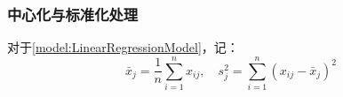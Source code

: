 \subsubsection{中心化与标准化处理}
\begin{definition}
	对于\cref{model:LinearRegressionModel}，记：
	\begin{equation*}
		\bar{x}_j=\frac{1}{n}\sum_{i=1}^{n}x_{ij},\quad s_j^2=\sum_{i=1}^{n}(x_{ij}-\bar{x}_j)^2
	\end{equation*}
\end{definition}